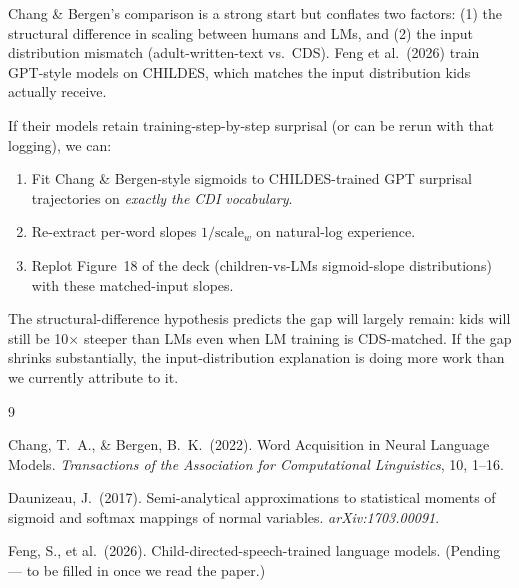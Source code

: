 \documentclass[11pt]{article}
\begin{document}
Chang \& Bergen's comparison is a strong start but conflates two
factors: (1) the structural difference in scaling between humans and
LMs, and (2) the input distribution mismatch (adult-written-text vs.\
CDS). Feng et al.~(2026) train GPT-style models on CHILDES, which
matches the input distribution kids actually receive.

If their models retain training-step-by-step surprisal (or can be
rerun with that logging), we can:
\begin{enumerate}[leftmargin=1.4em]
\item Fit Chang \& Bergen-style sigmoids to CHILDES-trained GPT
surprisal trajectories on \emph{exactly the CDI vocabulary}.
\item Re-extract per-word slopes $1/\mathrm{scale}_w$ on natural-log
experience.
\item Replot Figure~18 of the deck (children-vs-LMs sigmoid-slope
distributions) with these matched-input slopes.
\end{enumerate}

The structural-difference hypothesis predicts the gap will largely
remain: kids will still be 10$\times$ steeper than LMs even when LM
training is CDS-matched. If the gap shrinks substantially, the
input-distribution explanation is doing more work than we currently
attribute to it.

\begin{thebibliography}{9}

Chang, T.\ A., \& Bergen, B.\ K.~(2022).
Word Acquisition in Neural Language Models.
\emph{Transactions of the Association for Computational Linguistics}, 10, 1--16.

Daunizeau, J.~(2017).
Semi-analytical approximations to statistical moments of
sigmoid and softmax mappings of normal variables.
\emph{arXiv:1703.00091}.

Feng, S., et al.~(2026).
Child-directed-speech-trained language models. (Pending --- to be
filled in once we read the paper.)

\end{thebibliography}
\end{document}

